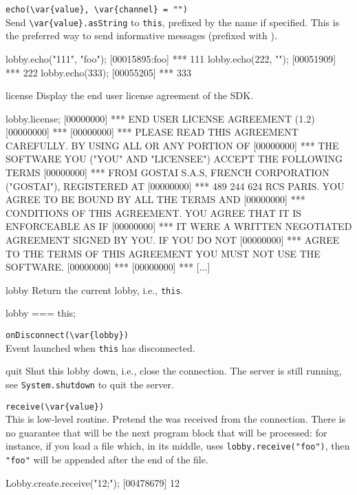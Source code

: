 \begin{urbiscriptapi}
\item \lstinline|echo(\var{value}, \var{channel} = "")|\\
  Send \lstinline|\var{value}.asString| to \lstinline|this|, prefixed
  by the   name if specified.  This is
  the preferred way to send informative messages (prefixed with
  \samp{***}).
\begin{urbiscript}
lobby.echo("111", "foo");
[00015895:foo] *** 111
lobby.echo(222, "");
[00051909] *** 222
lobby.echo(333);
[00055205] *** 333
\end{urbiscript}


\item[license]
  Display the end user license agreement of the \urbi SDK.
\begin{urbiunchecked}
lobby.license;
[00000000] *** END USER LICENSE AGREEMENT (1.2)
[00000000] ***
[00000000] *** PLEASE READ THIS AGREEMENT CAREFULLY.  BY USING ALL OR ANY PORTION OF
[00000000] *** THE SOFTWARE YOU ("YOU" AND "LICENSEE") ACCEPT THE FOLLOWING TERMS
[00000000] *** FROM GOSTAI S.A.S, FRENCH CORPORATION ("GOSTAI"), REGISTERED AT
[00000000] *** 489 244 624 RCS PARIS.  YOU AGREE TO BE BOUND BY ALL THE TERMS AND
[00000000] *** CONDITIONS OF THIS AGREEMENT.  YOU AGREE THAT IT IS ENFORCEABLE AS IF
[00000000] *** IT WERE A WRITTEN NEGOTIATED AGREEMENT SIGNED BY YOU.  IF YOU DO NOT
[00000000] *** AGREE TO THE TERMS OF THIS AGREEMENT YOU MUST NOT USE THE SOFTWARE.
[00000000] ***
[00000000] *** [...]
\end{urbiunchecked}

\item[lobby]
  Return the current lobby, i.e., \lstinline|this|.
\begin{urbiassert}
lobby === this;
\end{urbiassert}

\item \lstinline|onDisconnect(\var{lobby})|\\
  Event launched when \lstinline|this| has disconnected.

\item[quit] Shut this lobby down, i.e., close the connection.  The
  server is still running, see \lstinline|System.shutdown| to quit the
  server.

\item \lstinline|receive(\var{value})|\\
  This is low-level routine.  Pretend the 
   was received from the connection.  There is no guarantee
  that  will be the next program block that will be
  processed: for instance, if you load a file which, in its middle,
  uses \lstinline|lobby.receive("foo")|, then \lstinline|"foo"| will
  be appended after the end of the file.
\begin{urbiscript}
Lobby.create.receive("12;");
[00478679] 12
\end{urbiscript}


\end{urbiscriptapi}
